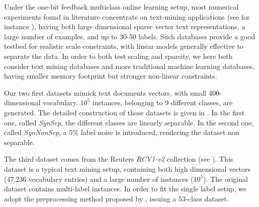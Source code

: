 \documentclass[preprint,12pt,authoryear]{elsarticle}
\begin{document}

Under the one-bit feedback multiclass online learning setup, most numerical experiments found in literature concentrate on text-mining applications (see for instance \cite{crammer2013multiclass}), having both large dimensional sparse vector text representations, a large number of examples, and up to 30-50  labels. Such databases provide a good testbed for realistic scale constraints, with linear models generally effective to separate the data. 
In order to both test scaling and sparsity, we here both consider text mining databases and more traditional machine learning databases, having smaller memory footprint but stronger non-linear constraints.

Our two first datasets mimick text documents vectors, with small 400-dimensional vocabulary. $10^5$ instances, belonging to 9 different classes, are generated. The detailed construction of those datasets is given in \cite{kakade2008efficient}. In the first one, called  \textit{SynSep}, the different classes are linearly separable. In the second one, called \textit{SynNonSep}, a 5\% label noise is introduced, rendering the dataset non separable.  

The third dataset comes from the Reuters \textit{RCV1-v2} collection (see \cite{David04RCV}). This dataset is a typical  text mining setup, containing both high dimensional vectors (47,236 vocabulary entries) and a large number of instances ($10^5$). 
The original dataset contains multi-label instances.  In order to fit the single label setup, we adopt the preprocessing method proposed by \cite{RB08a}, issuing a 53-class dataset.  





\end{document}
